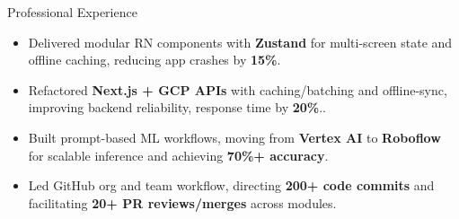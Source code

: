\documentclass{resume}
\begin{document}
\begin{experienceSection}{Professional Experience}
\begin{itemize}
    \item Delivered modular RN components with \textbf{Zustand} for multi-screen state and offline caching, reducing app crashes by \textbf{15\%}.

    \item Refactored \textbf{Next.js + GCP APIs} with caching/batching and offline-sync, improving backend reliability, response time by \textbf{20\%}..

    

    \item Built prompt-based ML workflows, moving from \textbf{Vertex AI} to \textbf{Roboflow} for scalable inference and achieving \textbf{70\%+ accuracy}.

    

    \item Led GitHub org and team workflow, directing \textbf{200+ code commits} and facilitating \textbf{20+ PR reviews/merges} across modules.

\end{itemize}
\end{experienceSection}
\end{document}
